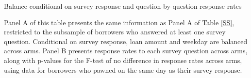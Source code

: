 
\vspace{-1em}

\begin{table}[H]
\caption{Balance conditional on survey response and question-by-question response rates} %
\label{SS_cond_survet}
\begin{center}
\scriptsize{}
\end{center}
\scriptsize

Panel A of this table presents the same information as Panel A of Table \ref{SS}, restricted to the subsample of borrowers who answered at least one survey question. Conditional on survey response, loan amount and weekday are balanced across arms. Panel B presents response rates to each survey question across arms, along with p-values for the F-test of no difference in response rates across arms, using data for borrowers who pawned on the same day as their survey response. 
\end{table}



